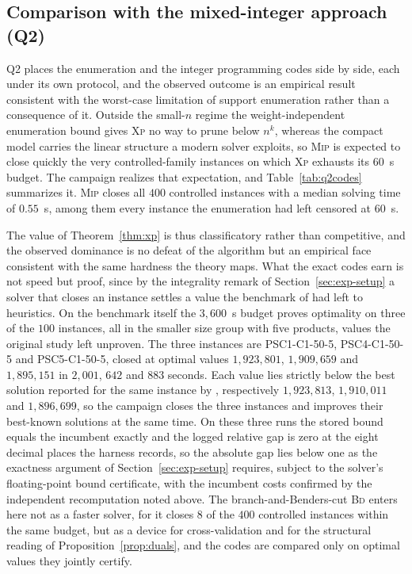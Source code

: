 \subsection{Comparison with the mixed-integer approach (Q2)}
\label{sec:exp-q2}

Q2 places the enumeration and the integer programming codes side by
side, each under its own protocol, and the observed outcome is an
empirical result consistent with the worst-case limitation of support
enumeration rather than a consequence of it. Outside the
small-$n$ regime the weight-independent enumeration bound gives \textsc{Xp} no
way to prune below $n^{k}$, whereas the compact model carries the linear
structure a modern solver exploits, so \textsc{Mip} is expected to close quickly the very controlled-family
instances on which \textsc{Xp} exhausts its $60$~s budget. The campaign
realizes that expectation, and Table~\ref{tab:q2codes} summarizes it.
\textsc{Mip} closes all $400$ controlled instances with a median solving
time of $0.55$~s, among them every instance the enumeration had left
censored at $60$~s.

 The value of
Theorem~\ref{thm:xp} is thus classificatory rather than competitive, and
the observed dominance is no defeat of the algorithm but an
empirical face consistent with the same hardness the theory maps. What the exact codes
earn is not speed but proof, since by the integrality remark of
Section~\ref{sec:exp-setup} a solver that closes an instance settles a
value the benchmark of \citet{MauriEtAl2021} had left to heuristics. On
the benchmark itself the $3{,}600$~s budget proves optimality on three of
the $100$ instances, all in the smaller size group with five products,
values the original study left unproven. The three instances are
PSC1-C1-50-5, PSC4-C1-50-5 and PSC5-C1-50-5, closed at optimal values
$1{,}923{,}801$, $1{,}909{,}659$ and $1{,}895{,}151$ in $2{,}001$, $642$
and $883$ seconds. Each value lies strictly below the best solution
reported for the same instance by \citet{MauriEtAl2021}, respectively
$1{,}923{,}813$, $1{,}910{,}011$ and $1{,}896{,}699$, so the campaign
closes the three instances and improves their best-known solutions at the
same time. On these three runs the stored bound equals the incumbent exactly and
the logged relative gap is zero at the eight decimal places the harness
records, so the absolute gap lies below one as the exactness argument of
Section~\ref{sec:exp-setup} requires, subject to the solver's
floating-point bound certificate, with the incumbent costs confirmed by
the independent recomputation noted above.
The branch-and-Benders-cut \textsc{Bd} enters here not as a faster
solver, for it closes $8$ of the $400$ controlled instances within the
same budget, but as a device for cross-validation and for the structural
reading of Proposition~\ref{prop:duals}, and the codes are compared only
on optimal values they jointly certify.

